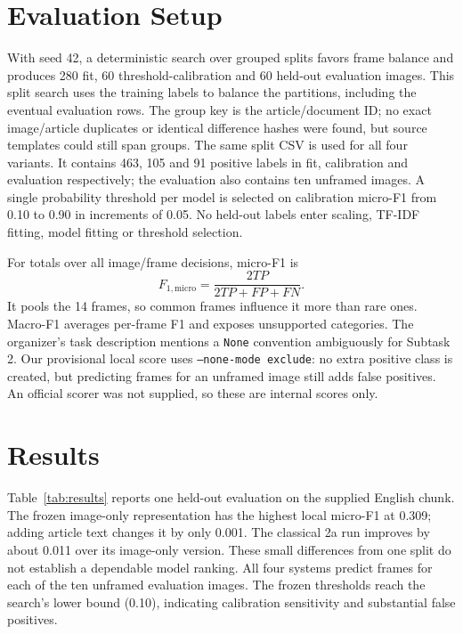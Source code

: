 \documentclass[11pt]{article}
\begin{document}
\section{Evaluation Setup}\label{sec:eval}
With seed 42, a deterministic search over grouped splits favors frame balance and produces 280 fit, 60 threshold-calibration and 60 held-out evaluation images. This split search uses the training labels to balance the partitions, including the eventual evaluation rows. The group key is the article/document ID; no exact image/article duplicates or identical difference hashes were found, but source templates could still span groups. The same split CSV is used for all four variants. It contains 463, 105 and 91 positive labels in fit, calibration and evaluation respectively; the evaluation also contains ten unframed images. A single probability threshold per model is selected on calibration micro-F1 from 0.10 to 0.90 in increments of 0.05. No held-out labels enter scaling, TF-IDF fitting, model fitting or threshold selection.

For totals over all image/frame decisions, micro-F1 is
\begin{equation}\label{eq:micro}
F_{1,\mathrm{micro}}=\frac{2TP}{2TP+FP+FN}.
\end{equation}
It pools the 14 frames, so common frames influence it more than rare ones. Macro-F1 averages per-frame F1 and exposes unsupported categories. The organizer's task description mentions a \texttt{None} convention ambiguously for Subtask 2. Our provisional local score uses \texttt{--none-mode exclude}: no extra positive class is created, but predicting frames for an unframed image still adds false positives. An official scorer was not supplied, so these are internal scores only.

\section{Results}\label{sec:results}
Table~\ref{tab:results} reports one held-out evaluation on the supplied English chunk. The frozen image-only representation has the highest local micro-F1 at 0.309; adding article text changes it by only 0.001. The classical 2a run improves by about 0.011 over its image-only version. These small differences from one split do not establish a dependable model ranking. All four systems predict frames for each of the ten unframed evaluation images. The frozen thresholds reach the search's lower bound (0.10), indicating calibration sensitivity and substantial false positives.
\end{document}
